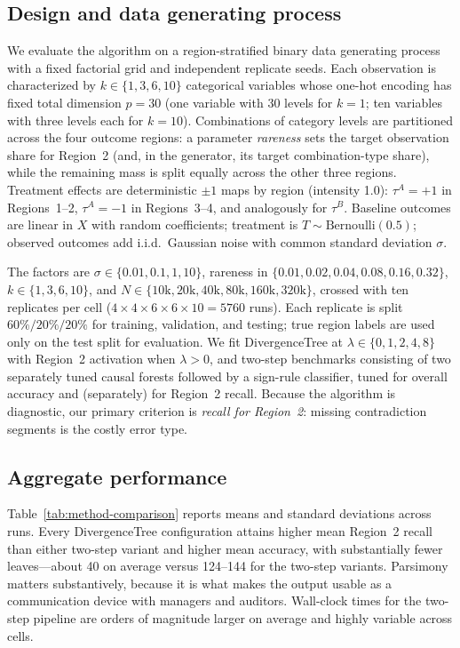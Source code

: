 \documentclass[12pt,a4paper]{article}
\begin{document}
\subsection{Design and data generating process}

We evaluate the algorithm on a region-stratified binary data generating process with a fixed factorial grid and independent replicate seeds. Each observation is characterized by $k\in\{1,3,6,10\}$ categorical variables whose one-hot encoding has fixed total dimension $p=30$ (one variable with 30 levels for $k=1$; ten variables with three levels each for $k=10$). Combinations of category levels are partitioned across the four outcome regions: a parameter \emph{rareness} sets the target observation share for Region~2 (and, in the generator, its target combination-type share), while the remaining mass is split equally across the other three regions. Treatment effects are deterministic $\pm 1$ maps by region (intensity 1.0): $\tau^A=+1$ in Regions~1--2, $\tau^A=-1$ in Regions~3--4, and analogously for $\tau^B$. Baseline outcomes are linear in $X$ with random coefficients; treatment is $T\sim\text{Bernoulli}(0.5)$; observed outcomes add i.i.d.\ Gaussian noise with common standard deviation $\sigma$.

The factors are $\sigma\in\{0.01,0.1,1,10\}$, rareness in $\{0.01,0.02,0.04,0.08,0.16,0.32\}$, $k\in\{1,3,6,10\}$, and $N\in\{10\text{k},20\text{k},40\text{k},80\text{k},160\text{k},320\text{k}\}$, crossed with ten replicates per cell ($4\times 4\times 6\times 6\times 10=5760$ runs). Each replicate is split $60\%/20\%/20\%$ for training, validation, and testing; true region labels are used only on the test split for evaluation. We fit DivergenceTree at $\lambda\in\{0,1,2,4,8\}$ with Region~2 activation when $\lambda>0$, and two-step benchmarks consisting of two separately tuned causal forests followed by a sign-rule classifier, tuned for overall accuracy and (separately) for Region~2 recall. Because the algorithm is diagnostic, our primary criterion is \emph{recall for Region~2}: missing contradiction segments is the costly error type.

\subsection{Aggregate performance}

Table~\ref{tab:method-comparison} reports means and standard deviations across runs. Every DivergenceTree configuration attains higher mean Region~2 recall than either two-step variant and higher mean accuracy, with substantially fewer leaves---about 40 on average versus 124--144 for the two-step variants. Parsimony matters substantively, because it is what makes the output usable as a communication device with managers and auditors. Wall-clock times for the two-step pipeline are orders of magnitude larger on average and highly variable across cells.
\end{document}
